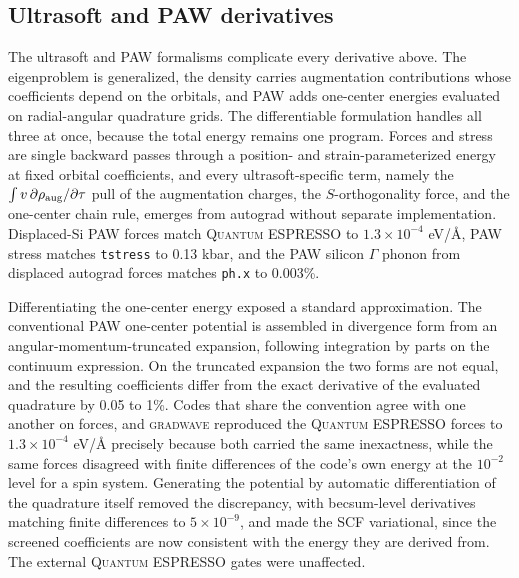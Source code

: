 \documentclass[11pt,twocolumn]{article}
\newcommand{\gw}{\textsc{gradwave}}
\newcommand{\qe}{\textsc{Quantum ESPRESSO}}
\begin{document}
\subsection{Ultrasoft and PAW derivatives}
\label{sec:paw-derivs}

The ultrasoft and PAW formalisms complicate every derivative above. The
eigenproblem is generalized, the density
carries augmentation contributions whose coefficients depend on the
orbitals, and PAW adds one-center energies evaluated on radial-angular
quadrature grids. The differentiable formulation handles all three at
once, because the total energy remains one program. Forces and stress are
single backward passes through a position- and strain-parameterized energy
at fixed orbital coefficients, and every ultrasoft-specific term, namely
the $\int v\,\partial\rho_{\rm aug}/\partial\tau$ pull of the augmentation
charges, the $S$-orthogonality force, and the one-center chain rule,
emerges from autograd without separate implementation. Displaced-Si PAW
forces match \qe{} to $1.3\times10^{-4}$ eV/\AA, PAW stress matches
\texttt{tstress} to 0.13 kbar, and the PAW silicon $\Gamma$ phonon from
displaced autograd forces matches \texttt{ph.x} to 0.003\%.

Differentiating the one-center energy exposed a standard approximation.
The conventional PAW one-center potential is assembled in divergence form
from an angular-momentum-truncated expansion, following integration by
parts on the continuum expression. On the truncated expansion the two
forms are not equal, and the resulting coefficients differ from the exact
derivative of the evaluated quadrature by 0.05 to 1\%. Codes that share
the convention agree with one another on forces, and \gw{} reproduced the
\qe{} forces to $1.3\times10^{-4}$ eV/\AA{} precisely because both carried
the same inexactness, while the same forces disagreed with finite
differences of the code's own energy at the $10^{-2}$ level for a spin
system. Generating the potential by automatic differentiation of the
quadrature itself removed the discrepancy, with becsum-level derivatives
matching finite differences to $5\times10^{-9}$, and made the SCF
variational, since the screened coefficients are now consistent with the
energy they are derived from. The external \qe{} gates were unaffected.
\end{document}
